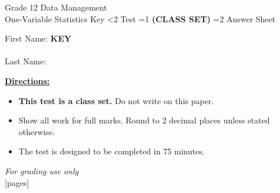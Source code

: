 \documentclass[addpoints]{exam}
\newcommand{\event}{One-Variable Statistics}
\newcommand{\tournament}{}
\def\type{0}
\begin{document}
\begin{center}
    {\huge Grade 12 Data Management \\ \event
    \ifprintanswers \space Key
    \else \space \ifnum\type<2 Test \fi \ifnum\type=1 \textbf{(CLASS SET)} \fi
          \ifnum\type=2 Answer Sheet \fi
    \fi \\ \vspace{3mm}\tournament\vspace{1mm}}
\end{center}

\vspace{.25\textheight}

\begin{center}
    First Name: \ifprintanswers
    \underline{\hspace{3.5cm}}\textbf{KEY}\underline{\hspace{5.5cm}}\\\vspace{5mm}
    \else \underline{\hspace{10cm}}\\ \vspace{5mm} \fi
    Last Name: \underline{\hspace{10cm}}\\ \vspace{5mm}
\end{center}

\noindent\textbf{\underline{Directions:}}
\begin{itemize}
    \ifnum\type=1 \item \textbf{This test is a class set.} Do not write on this paper. \fi
    \item Show all work for full marks. Round to 2 decimal places unless stated otherwise.
    \item The test is designed to be completed in 75 minutes.
\end{itemize}
\begin{center}
\textit{For grading use only}\\
[pages]
\end{center}
\end{document}

